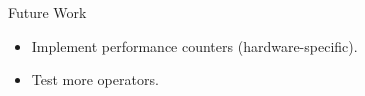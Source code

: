 \begin{block}{Future Work}
  \begin{itemize}
  \item Implement performance counters (hardware-specific).
  \item Test more operators.
  \end{itemize}
\end{block}

